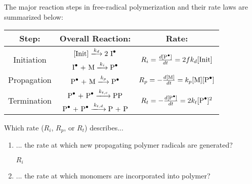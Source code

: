 \begin{activity}
\begin{ctqs}
\begin{enumerate}
		\end{enumerate}

\end{ctqs}



\begin{model}
\label{\labelbase:mdl:kineticssummary}

	The major reaction steps in free-radical polymerization and their rate laws are summarized below:
	
	\begin{center}
		\renewcommand{\arraystretch}{2}
		\begin{tabular}{c c c}
			\textbf{Step:} & \textbf{Overall Reaction:} & \textbf{Rate:}\\\hline
			\multirow{2}{*}{Initiation} & $[\text{Init}] \xlongrightarrow{k_d} \text{2 \ce{I^.}}$ & \multirow{2}{*}{$ R_i = \frac{d\text{[\ce{P^.}]}}{dt} = 2fk_d[\text{Init}]$}\\
			 & $\text{\ce{I^.} + M} \xlongrightarrow{k_i} \text{\ce{P^.}}$ & \\\hline
			Propagation & $\text{\ce{P^.} + M} \xlongrightarrow{k_p} \text{\ce{P^.}}$ & $R_p = -\frac{d[\text{M}]}{dt} = k_p\text{[M][\ce{P^.}]}$\\\hline
			\multirow{2}{*}{Termination} & $\text{\ce{P^.} + \ce{P^.}} \xlongrightarrow{k_{t,c}} \text{\ce{PP}}$ & \multirow{2}{*}{$R_t = -\frac{d[\text{\ce{P^.}}]}{dt} = 2k_t [\text{\ce{P^.}}]^2$}\\
			& $\text{\ce{P^.} + \ce{P^.}} \xlongrightarrow{k_{t,d}} \text{P + P}$ & \\\hline
		\end{tabular}
	\end{center}
	\vspace{6pt}

\end{model}

\begin{ctqs}

	\question Which rate ($R_i$, $R_p$, or $R_t$) describes...
	
		\begin{enumerate}
			\item ... the rate at which new propagating polymer radicals are generated?
			
				\begin{solution}[0.4in]
					$R_i$
				\end{solution}
				
			\item ... the rate at which monomers are incorporated into polymer?
			

\end{enumerate}
\end{ctqs}
\end{activity}
